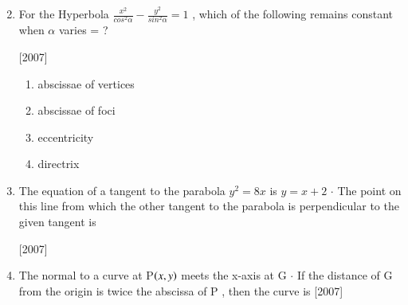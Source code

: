 \documentclass[journal,12pt,twocolumn]{IEEEtran}
\theoremstyle{remark}
\begin{document}
\begin{enumerate}
\begin{enumerate}[label=(\alph*)]
\begin{multicols}{2}
\end{multicols}
\end{enumerate}

\hfill

\item For the Hyperbola {$ \frac{x^2}{cos^2 \alpha} - \frac{y^2}{sin^2 \alpha} = 1 $} , which of the  following remains constant when {$ \alpha $} varies = ? 

\hfill
\hfill{[2007]}

\begin{enumerate}[label=(\alph*)]

	
\item abscissae of vertices 
\item abscissae of foci
\item eccentricity
\item directrix


\end{enumerate}

\hfill


\item The equation of a tangent to the parabola {$ y^2 = 8x $} is {$ y = x + 2 $} {$ \cdot $}  The point on this line from which the other tangent to the parabola is perpendicular to the given tangent is

\hfill 
\hfill{[2007]}

\begin{enumerate}[label=(\alph*)]
\end{enumerate}

\hfill

\item The normal to a curve at P{$ \left(x, y\right) $} meets the x-axis at G {$ \cdot $} If the distance of G from the origin is twice the abscissa of P , then the curve is \hfill {[2007]}

\begin{enumerate}[label=(\alph*)]
\end{enumerate}
\end{enumerate}
\end{document}
